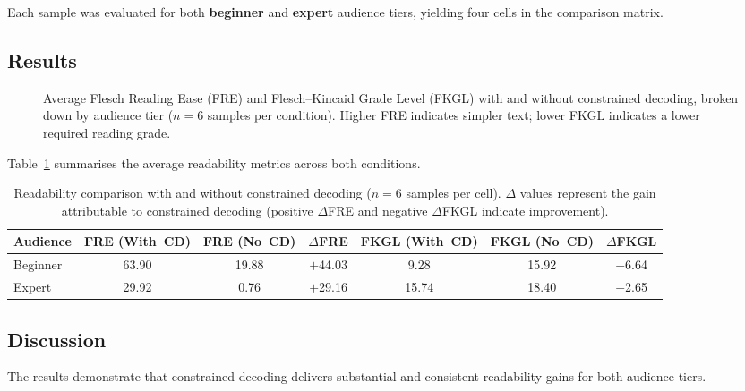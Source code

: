 Each sample was evaluated for both \textbf{beginner} and \textbf{expert} audience tiers, yielding four cells in the comparison matrix.

\subsection{Results}

\begin{figure}[h]
    \centering
    \caption{Average Flesch Reading Ease (FRE) and Flesch--Kincaid Grade Level (FKGL) with and without constrained decoding, broken down by audience tier ($n = 6$ samples per condition). Higher FRE indicates simpler text; lower FKGL indicates a lower required reading grade.}
    \label{fig:cd_comparison_bar}
\end{figure}

Table~\ref{tab:cd_readability} summarises the average readability metrics across both conditions.

\begin{table}[h]
\centering
\small
\begin{tabular}{lcccccc}
\toprule
\textbf{Audience} & \textbf{FRE (With~CD)} & \textbf{FRE (No~CD)} & \textbf{$\Delta$FRE} & \textbf{FKGL (With~CD)} & \textbf{FKGL (No~CD)} & \textbf{$\Delta$FKGL} \\
\midrule
Beginner & 63.90 & 19.88 & $+$44.03 & 9.28  & 15.92 & $-$6.64 \\
Expert   & 29.92 &  0.76 & $+$29.16 & 15.74 & 18.40 & $-$2.65 \\
\bottomrule
\end{tabular}
\caption{Readability comparison with and without constrained decoding ($n = 6$ samples per cell). $\Delta$ values represent the gain attributable to constrained decoding (positive $\Delta$FRE and negative $\Delta$FKGL indicate improvement).}
\label{tab:cd_readability}
\end{table}

\subsection{Discussion}

The results demonstrate that constrained decoding delivers substantial and consistent readability gains for both audience tiers.

